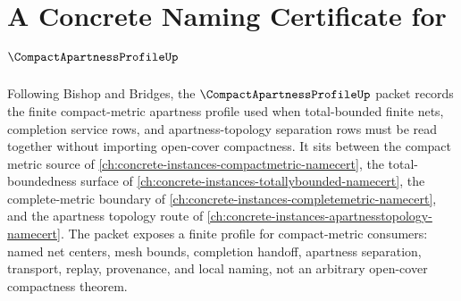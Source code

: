 \chapter{A Concrete Naming Certificate for $\CompactApartnessProfileUp$}
\label{ch:concrete-instances-compact-apartness-profile-namecert}

Following Bishop and Bridges, the $\CompactApartnessProfileUp$ packet records the finite compact-metric apartness profile used when total-bounded finite nets, completion service rows, and apartness-topology separation rows must be read together without importing open-cover compactness. It sits between the compact metric source of \autoref{ch:concrete-instances-compactmetric-namecert}, the total-boundedness surface of \autoref{ch:concrete-instances-totallybounded-namecert}, the complete-metric boundary of \autoref{ch:concrete-instances-completemetric-namecert}, and the apartness topology route of \autoref{ch:concrete-instances-apartnesstopology-namecert}. The packet exposes a finite profile for compact-metric consumers: named net centers, mesh bounds, completion handoff, apartness separation, transport, replay, provenance, and local naming, not an arbitrary open-cover compactness theorem.

